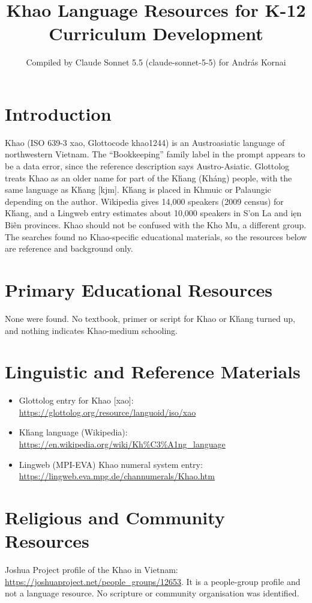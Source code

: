 \documentclass[12pt]{article}
\title{Khao Language Resources for K-12 Curriculum Development}
\author{Compiled by Claude Sonnet 5.5 (claude-sonnet-5-5) for Andr\'as Kornai}
\date{}
\begin{document}
\maketitle

\section{Introduction}
Khao (ISO 639-3 xao, Glottocode khao1244) is an Austroasiatic language of northwestern Vietnam. The ``Bookkeeping'' family label in the prompt appears to be a data error, since the reference description says Austro-Asiatic. Glottolog treats Khao as an older name for part of the K\'hang (Kh\'ang) people, with the same language as K\'hang [kjm]. K\'hang is placed in Khmuic or Palaungic depending on the author. Wikipedia gives 14,000 speakers (2009 census) for K\'hang, and a Lingweb entry estimates about 10,000 speakers in S\a'on La and \DH i\d{e}n Bi\^en provinces. Khao should not be confused with the Kho Mu, a different group. The searches found no Khao-specific educational materials, so the resources below are reference and background only.

\section{Primary Educational Resources}
None were found. No textbook, primer or script for Khao or K\'hang turned up, and nothing indicates Khao-medium schooling.

\section{Linguistic and Reference Materials}
\begin{itemize}
\item Glottolog entry for Khao [xao]: \url{https://glottolog.org/resource/languoid/iso/xao}
\item K\'hang language (Wikipedia): \url{https://en.wikipedia.org/wiki/Kh%C3%A1ng_language}
\item Lingweb (MPI-EVA) Khao numeral system entry: \url{https://lingweb.eva.mpg.de/channumerals/Khao.htm}
\end{itemize}

\section{Religious and Community Resources}
Joshua Project profile of the Khao in Vietnam: \url{https://joshuaproject.net/people_groups/12653}. It is a people-group profile and not a language resource. No scripture or community organisation was identified.
\end{document}
